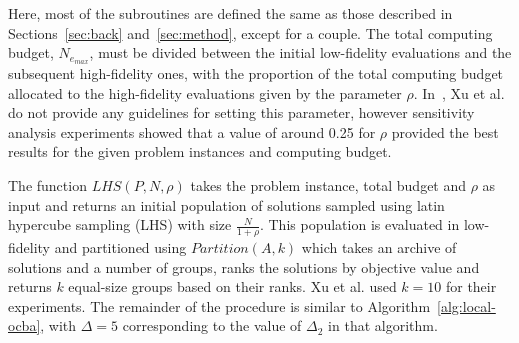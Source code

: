 Here, most of the subroutines are defined the same as those described in Sections~\ref{sec:back} and~\ref{sec:method}, except for a couple. The total computing budget, $N_{e_{max}}$, must be divided between the initial low-fidelity evaluations and the subsequent high-fidelity ones, with the proportion of the total computing budget allocated to the high-fidelity evaluations given by the parameter $\rho$. In~\cite{xu2016mo2tos}, Xu et al. do not provide any guidelines for setting this parameter, however sensitivity analysis experiments showed that a value of around 0.25 for $\rho$ provided the best results for the given problem instances and computing budget. 

The function $LHS(P,N,\rho)$ takes the problem instance, total budget and $\rho$ as input and returns an initial population of solutions sampled using latin hypercube sampling (LHS) with size $\frac{N}{1+\rho}$. This population is evaluated in low-fidelity and partitioned using $Partition(A,k)$ which takes an archive of solutions and a number of groups, ranks the solutions by objective value and returns $k$ equal-size groups based on their ranks. Xu et al. used $k=10$ for their experiments. The remainder of the procedure is similar to Algorithm~\ref{alg:local-ocba}, with $\Delta = 5$ corresponding to the value of $\Delta_2$ in that algorithm.

